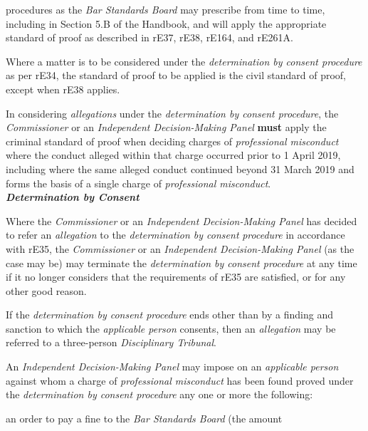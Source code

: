 procedures as the \emph{Bar Standards Board} may prescribe from time to
time, including in Section 5.B of the Handbook, and will apply the
appropriate standard of proof as described in rE37, rE38, rE164, and
rE261A. \\
\par
Where a matter is to be considered under the \emph{determination by
consent procedure} as per rE34, the standard of proof to be applied is
the civil standard of proof, except when rE38 applies.\\
\par
In considering \emph{allegations} under the \emph{determination by
consent procedure}, the \emph{Commissioner} or an \emph{Independent
Decision-Making Panel}  \textcolor{myred}{\textbf{must}} apply the criminal standard of proof when
deciding charges of \emph{professional misconduct} where the conduct
alleged within that charge occurred prior to 1 April 2019, including
where the same alleged conduct continued beyond 31 March 2019 and forms
the basis of a single charge of \emph{professional misconduct}.\\
\textbf{\emph{Determination by Consent}}\par
{}\par
Where the \emph{Commissioner} or an \emph{Independent Decision-Making
Panel }has decided to refer an \emph{allegation} to
the \emph{determination by consent} \emph{procedure} in accordance with
rE35, the \emph{Commissioner} or an \emph{Independent Decision-Making
Panel} (as the case may be) may terminate the \emph{determination by
consent procedure} at any time if it no longer considers that the
requirements of rE35 are satisfied, or for any other good reason.\\
\par
If the \emph{determination by consent procedure }ends other than by a
finding and sanction to which the \emph{applicable person} consents,
then an \emph{allegation} may be referred to a
three-person \emph{Disciplinary Tribunal}.\\
\par
An \emph{Independent Decision-Making Panel }may impose on
an \emph{applicable person} against whom a charge of \emph{professional
misconduct} has been found proved under the \emph{determination by
consent procedure} any one or more the following:\\\nl \item an order to pay a fine to the \emph{Bar Standards Board} (the amount
